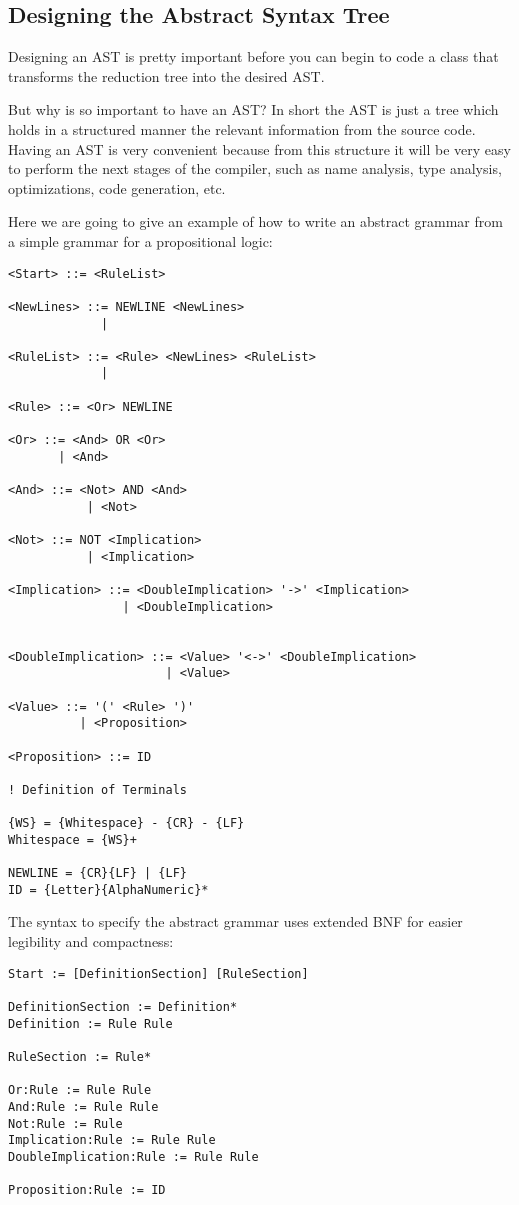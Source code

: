 \documentclass[a4paper]{article}
\begin{document}
\subsection {Designing the Abstract Syntax Tree}
Designing an AST is pretty important before you can begin to code a class that transforms the reduction tree into the desired AST. 

But why is so important to have an AST? In short the AST is just a tree which holds in a structured manner the relevant information from the source code. Having an AST is very convenient because from this structure it will be very easy to perform the next stages of the compiler, such as name analysis, type analysis, optimizations, code generation, etc.

Here we are going to give an example of how to write an abstract grammar from a simple grammar for a propositional logic:

\begin{verbatim}
<Start> ::= <RuleList>

<NewLines> ::= NEWLINE <NewLines>
             | 
            
<RuleList> ::= <Rule> <NewLines> <RuleList>
             |

<Rule> ::= <Or> NEWLINE

<Or> ::= <And> OR <Or> 
       | <And> 

<And> ::= <Not> AND <And> 
           | <Not> 
 
<Not> ::= NOT <Implication> 
           | <Implication> 

<Implication> ::= <DoubleImplication> '->' <Implication> 
                | <DoubleImplication> 
             

<DoubleImplication> ::= <Value> '<->' <DoubleImplication>
                      | <Value>

<Value> ::= '(' <Rule> ')'
          | <Proposition> 

<Proposition> ::= ID

! Definition of Terminals

{WS} = {Whitespace} - {CR} - {LF}
Whitespace = {WS}+

NEWLINE = {CR}{LF} | {LF}
ID = {Letter}{AlphaNumeric}*
\end{verbatim}

The syntax to specify the abstract grammar uses extended BNF for easier legibility and compactness:

\begin{verbatim}
Start := [DefinitionSection] [RuleSection]

DefinitionSection := Definition*
Definition := Rule Rule

RuleSection := Rule*

Or:Rule := Rule Rule
And:Rule := Rule Rule
Not:Rule := Rule
Implication:Rule := Rule Rule
DoubleImplication:Rule := Rule Rule

Proposition:Rule := ID
\end{verbatim}
\end{document}
